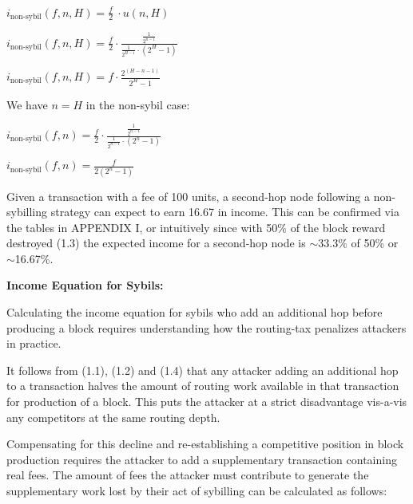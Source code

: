 \documentclass[oneside]{article}   	%
\begin{document}
\begin{multicols}{2}
\begin{adjustwidth}{1.5em}{1.5em}
	\begin{math}
i_{\text{non-sybil}}(f, n, H) = \frac{f}{2}\ \cdot u(n,H)
	\end{math}

	\begin{math}
i_{\text{non-sybil}}(f, n, H) = \frac{f}{2} \cdot \frac{\frac{1}{2^{n-1}}}{\frac{1}{2^{H-1}} \cdot (2^{H} -1)}
	\end{math}

	\begin{math}
i_{\text{non-sybil}}(f, n, H) = f \cdot \frac{2^{\left(H - n - 1\right)}}{2^H - 1}
	\end{math}
\end{adjustwidth}
\normalsize

We have \begin{math}n = H\end{math} in the non-sybil case:

\large
\begin{adjustwidth}{1.5em}{1.5em} 
	\begin{math}
i_{\text{non-sybil}}(f, n) = \frac{f}{2} \cdot \frac{\frac{1}{2^{n-1}}}{\frac{1}{2^{n-1}} \cdot (2^{n}-1)}
	\end{math}

	\begin{math}
i_{\text{non-sybil}}(f, n) = \frac{f}{2(2^n - 1)}
	\end{math}
\end{adjustwidth}
\normalsize

Given a transaction with a fee of 100 units, a second-hop node following a non-sybilling strategy can expect to earn 16.67 in income. This can be confirmed via the tables in APPENDIX I, or intuitively since with 50\% of the block reward destroyed (1.3) the expected income for a second-hop node is $\sim$33.3\% of 50\% or $\sim$16.67\%.

\textbf{Income Equation for Sybils:}

Calculating the income equation for sybils who add an additional hop before producing a block requires understanding how the routing-tax penalizes attackers in practice.

It follows from (1.1), (1.2) and (1.4) that any attacker adding an additional hop to a transaction halves the amount of routing work available in that transaction for production of a block. This puts the attacker at a strict disadvantage vis-a-vis any competitors at the same routing depth.

Compensating for this decline and re-establishing a competitive position in block production requires the attacker to add a supplementary transaction containing real fees. The amount of fees the attacker must contribute to generate the supplementary work lost by their act of sybilling can be calculated as follows:


\end{multicols}
\end{document}
